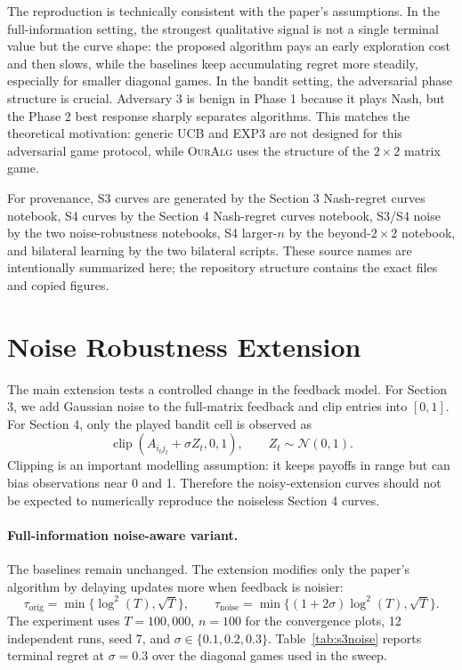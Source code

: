 \documentclass[a4paper,11pt]{article}
\theoremstyle{definition}
\newcommand{\OurAlg}{\textsc{OurAlg}}
\begin{document}
The reproduction is technically consistent with the paper's assumptions. In the full-information setting, the strongest qualitative signal is not a single terminal value but the curve shape: the proposed algorithm pays an early exploration cost and then slows, while the baselines keep accumulating regret more steadily, especially for smaller diagonal games. In the bandit setting, the adversarial phase structure is crucial. Adversary 3 is benign in Phase 1 because it plays Nash, but the Phase 2 best response sharply separates algorithms. This matches the theoretical motivation: generic UCB and EXP3 are not designed for this adversarial game protocol, while \OurAlg{} uses the structure of the $2\times2$ matrix game.

For provenance, S3 curves are generated by the Section 3 Nash-regret curves notebook, S4 curves by the Section 4 Nash-regret curves notebook, S3/S4 noise by the two noise-robustness notebooks, S4 larger-$n$ by the beyond-$2\times2$ notebook, and bilateral learning by the two bilateral scripts. These source names are intentionally summarized here; the repository structure contains the exact files and copied figures.

\section{Noise Robustness Extension}

The main extension tests a controlled change in the feedback model. For Section 3, we add Gaussian noise to the full-matrix feedback and clip entries into $[0,1]$. For Section 4, only the played bandit cell is observed as
\[
  \operatorname{clip}\!\left(A_{i_tj_t}+\sigma Z_t,0,1\right),\qquad Z_t\sim\mathcal{N}(0,1).
\]
Clipping is an important modelling assumption: it keeps payoffs in range but can bias observations near 0 and 1. Therefore the noisy-extension curves should not be expected to numerically reproduce the noiseless Section 4 curves.

\paragraph{Full-information noise-aware variant.}
The baselines remain unchanged. The extension modifies only the paper's algorithm by delaying updates more when feedback is noisier:
\[
  \tau_{\text{orig}}=\min\{\log^2(T),\sqrt{T}\},\qquad
  \tau_{\text{noise}}=\min\{(1+2\sigma)\log^2(T),\sqrt{T}\}.
\]
The experiment uses $T=100{,}000$, $n=100$ for the convergence plots, 12 independent runs, seed 7, and $\sigma\in\{0.1,0.2,0.3\}$. Table~\ref{tab:s3noise} reports terminal regret at $\sigma=0.3$ over the diagonal games used in the sweep.
\end{document}
